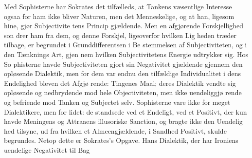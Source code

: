 \documentclass[12pt,a4paper]{book}
\begin{document}
Med Sophisterne har Sokrates det tilfælleds, at Tankens
væsentlige Interesse ogsaa for ham ikke bliver Naturen, men
det Menneskelige, og at han, ligesom hine, gjør Subjectivite\-%
tens Princip gjældende. Men en afgjørende Forskjellighed son\-%
drer ham fra dem, og denne Forskjel, ligeoverfor hvilken Lig\-%
heden træder tilbage, er begrundet i Grunddifferentsen i Be\-%
stemmelsen af Subjectiviteten, og i den Tænknings Art, gjen\-%
nem hvilken Subjectivitetens Energie udtrykker sig. Hos So\-%
phisterne havde Subjectiviteten gjort sin Negativitet gjældende
gjennem den opløsende Dialektik, men for dem var endnu den
tilfældige Individualitet i dens Endelighed bleven det Afgjø\-%
rende: Tingenes Maal; deres Dialektik vendte sig opløsende og
nedbrydende mod hele Objectiviteten, men ikke uendeliggjø\-%
rende og befriende mod Tanken og Subjectet selv. Sophisterne
vare ikke for meget Dialektikere, men for lidet: de standsede
ved et Endeligt, ved et Positivt, der kun havde Meningens og
Attraaens illusoriske Sanction, og bragte ikke den Uendelig\-%
hed tilsyne, ud fra hvilken et Almeengjældende, i Sandhed
Positivt, skulde begrundes. Netop dette er Sokrates's Opgave.
Hans Dialektik, der har Ironiens uendelige Negativitet til Bag\-%
\end{document}
